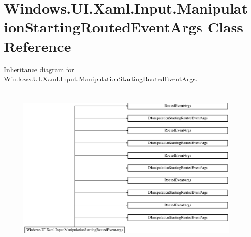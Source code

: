 \hypertarget{class_windows_1_1_u_i_1_1_xaml_1_1_input_1_1_manipulation_starting_routed_event_args}{}\section{Windows.\+U\+I.\+Xaml.\+Input.\+Manipulation\+Starting\+Routed\+Event\+Args Class Reference}
\label{class_windows_1_1_u_i_1_1_xaml_1_1_input_1_1_manipulation_starting_routed_event_args}
Inheritance diagram for Windows.\+U\+I.\+Xaml.\+Input.\+Manipulation\+Starting\+Routed\+Event\+Args\+:\begin{figure}[H]
\begin{center}
\leavevmode
\includegraphics[height=8.438356cm]{class_windows_1_1_u_i_1_1_xaml_1_1_input_1_1_manipulation_starting_routed_event_args}
\end{center}
\end{figure}
